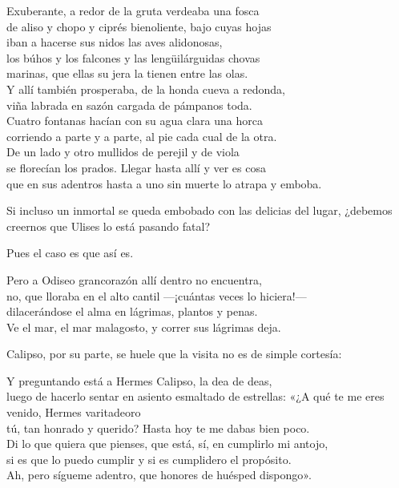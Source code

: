 \begin{versocita}
Exuberante, a redor de la gruta verdeaba una fosca\\
de aliso y chopo y ciprés bienoliente, bajo cuyas hojas\\
iban a hacerse sus nidos las aves alidonosas,\\
los búhos y los falcones y las lengüilárguidas chovas\\
marinas, que ellas su jera la tienen entre las olas.\\
Y allí también prosperaba, de la honda cueva a redonda,\\
viña labrada en sazón cargada de pámpanos toda.\\
Cuatro fontanas hacían con su agua clara una horca\\
corriendo a parte y a parte, al pie cada cual de la otra.\\
De un lado y otro mullidos de perejil y de viola\\
se florecían los prados. Llegar hasta allí y ver es cosa\\
que en sus adentros hasta a uno sin muerte lo atrapa y emboba.
\end{versocita}

Si incluso un inmortal se queda embobado con las delicias del lugar, ¿debemos creernos que Ulises lo está pasando fatal?

Pues el caso es que así es.

\begin{versocita}
Pero a Odiseo grancorazón allí dentro no encuentra,\\
no, que lloraba en el alto cantil ---¡cuántas veces lo hiciera!---\\
dilacerándose el alma en lágrimas, plantos y penas.\\
Ve el mar, el mar malagosto, y correr sus lágrimas deja.
\end{versocita}

Calipso, por su parte, se huele que la visita no es de simple cortesía:

\begin{versocita}
Y preguntando está a Hermes Calipso, la dea de deas,\\
luego de hacerlo sentar en asiento esmaltado de estrellas:
\stanzabreak
«¿A qué te me eres venido, Hermes varitadeoro\\
tú, tan honrado y querido? Hasta hoy te me dabas bien poco.\\
Di lo que quiera que pienses, que está, sí, en cumplirlo mi antojo,\\
si es que lo puedo cumplir y si es cumplidero el propósito.\\
Ah, pero sígueme adentro, que honores de huésped dispongo».
\end{versocita}

